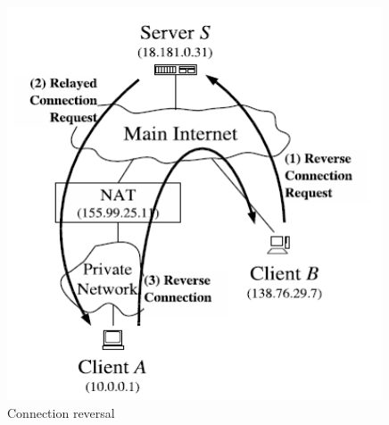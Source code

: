 \begin{enumerate}
          \begin{figure}[H]
              \centering
              \includegraphics[width=0.7
                  \textwidth]{immagini/Connection_reversal.png}
              \caption*{Connection reversal}
          \end{figure}
\end{enumerate}
